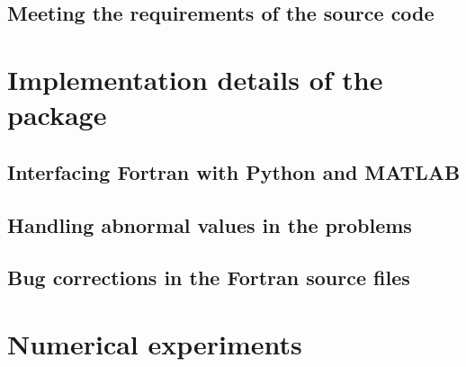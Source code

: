 \subsection{Meeting the requirements of the source code}

\section{Implementation details of the  package}

\subsection{Interfacing Fortran with Python and MATLAB}

\subsection{Handling abnormal values in the problems}

\subsection{Bug corrections in the Fortran source files}

\section{Numerical experiments}
